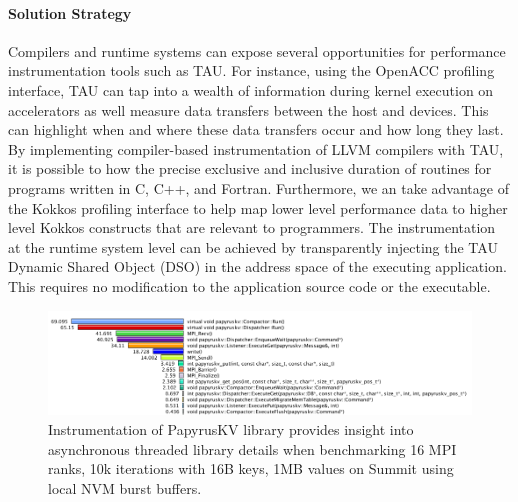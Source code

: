 \paragraph{Solution Strategy} Compilers and runtime systems can expose several opportunities for performance instrumentation tools such as TAU.  For instance, using the OpenACC profiling interface, TAU can tap into a wealth of information during kernel execution on accelerators as well measure data transfers between the host and devices. This can highlight when and where these data transfers occur and how long they last.  By implementing compiler-based instrumentation of LLVM compilers with TAU, it is possible to how the precise exclusive and inclusive duration of routines for programs written in C, C++, and Fortran.  Furthermore, we an take advantage of the Kokkos profiling interface to help map lower level performance data to higher level Kokkos constructs that are relevant to programmers. The instrumentation at the runtime system level can be achieved by transparently injecting the TAU Dynamic Shared Object (DSO) in the address space of the executing application. This requires no modification to the application source code or the executable. 

\begin{figure}[htb]
\centering
\includegraphics[width=6in]{projects/2.3.2-Tools/2.3.2.10-PROTEAS-YTUNE/tau-papyruskv}
\caption{
  Instrumentation of PapyrusKV library provides insight into asynchronous threaded library details when benchmarking 16 MPI ranks, 10k iterations with 16B keys, 1MB values on Summit using local NVM burst buffers.}
\label{figure:tau}
\end{figure}

